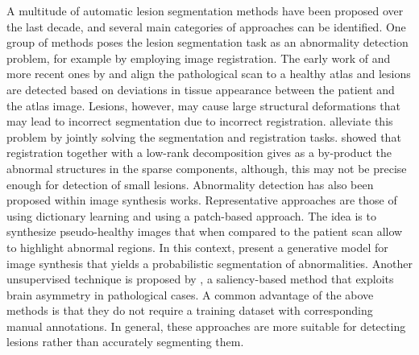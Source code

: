 \documentclass[preprint,authoryear,12pt]{elsarticle}
\begin{document}
A multitude of automatic lesion segmentation methods have been proposed over the last decade, and several main categories of approaches can be identified. One group of methods poses the lesion segmentation task as an abnormality detection problem, for example by employing image registration. The early work of \cite{Prastawa2004} and more recent ones by \cite{Schmidt2012} and \cite{doyle2013Brats} align the pathological scan to a healthy atlas and lesions are detected based on deviations in tissue appearance between the patient and the atlas image. Lesions, however, may cause large structural deformations that may lead to incorrect segmentation due to incorrect registration. \cite{Gooya2011,Parisot2012} alleviate this problem by jointly solving the segmentation and registration tasks. \cite{Liu2014} showed that registration together with a low-rank decomposition gives as a by-product the abnormal structures in the sparse components, although, this may not be precise enough for detection of small lesions. Abnormality detection has also been proposed within image synthesis works. Representative approaches are those of \cite{Weiss2013} using dictionary learning and \cite{Ye2013a} using a patch-based approach. The idea is to synthesize pseudo-healthy images that when compared to the patient scan allow to highlight abnormal regions. In this context, \cite{cardoso15} present a generative model for image synthesis that yields a probabilistic segmentation of abnormalities. Another unsupervised technique is proposed by \cite{Erihov2015}, a saliency-based method that exploits brain asymmetry in pathological cases. A common advantage of the above methods is that they do not require a training dataset with corresponding manual annotations. In general, these approaches are more suitable for detecting lesions rather than accurately segmenting them.
\end{document}
